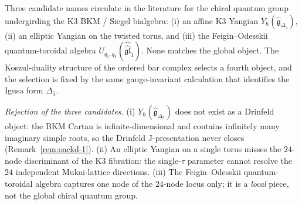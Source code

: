 \begin{remark}
\label{rem:k3-chiral-quantum-group-identification}
\ClaimStatusConditional
{}%
%
%
Three candidate names circulate in the literature for the chiral
quantum group undergirding the K3 BKM / Siegel bialgebra:
(i) an affine K3 Yangian $Y_\hbar(\widehat{\mathfrak{g}}_{\Delta_5})$,
(ii) an elliptic Yangian on the twisted torus, and
(iii) the Feigin--Odesskii quantum-toroidal algebra
$U_{q_1,q_2}(\widehat{\widehat{\mathfrak{gl}}}_1)$. None matches the
global object. The Koszul-duality structure of the ordered bar
complex selects a fourth object, and the selection is fixed by the
same gauge-invariant calculation that identifies the Igusa form
$\Delta_5$.

\smallskip
\noindent\emph{Rejection of the three candidates.}
(i) $Y_\hbar(\widehat{\mathfrak{g}}_{\Delta_5})$ does not exist as a
Drinfeld object: the BKM Cartan is infinite-dimensional and contains
infinitely many imaginary simple roots, so the Drinfeld
J-presentation never closes
\textup{(}Remark~\textup{\ref{rem:oackd-1}}\textup{)}.
(ii) An elliptic Yangian on a single torus misses the $24$-node
discriminant of the K3 fibration: the single-$\tau$ parameter cannot
resolve the $24$ independent Mukai-lattice directions.
(iii) The Feigin--Odesskii quantum-toroidal algebra
captures one node of the $24$-node locus only; it is a \emph{local}
piece, not the global chiral quantum group.


\end{remark}
